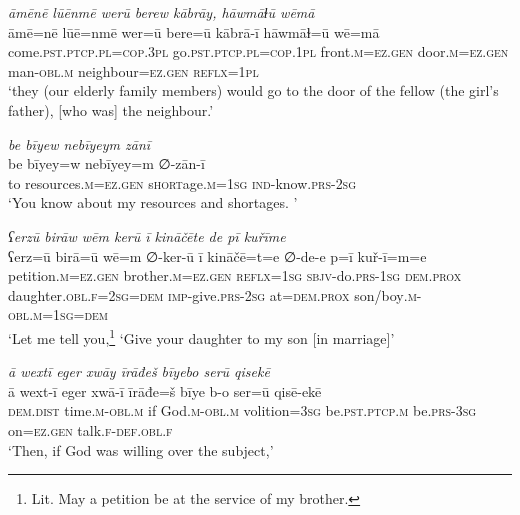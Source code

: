 \ea \label{RE.3}
\textit{āmēnē lūēnmē werū berew kābrāy, hāwmāɫū wēmā} \\ 
\gll āmē=nē lūē=nmē wer=ū bere=ū kābrā-ī hāwmāɫ=ū wē=mā \\ 
 come\textsc{.pst}\textsc{.ptcp}\textsc{.pl}\textsc{=cop}\textsc{.3pl} go\textsc{.pst}\textsc{.ptcp}\textsc{.pl}\textsc{=cop}\textsc{.\textsc{1pl}} front\textsc{.m}\textsc{\textsc{=ez.gen}} door\textsc{.m}\textsc{\textsc{=ez.gen}} man\textsc{-obl}\textsc{.m} neighbour\textsc{\textsc{=ez.gen}} \textsc{reflx}\textsc{=\textsc{1pl}} \\ 
\glt `they (our elderly family members) would go to the door of the fellow (the girl’s father), [who was] the neighbour.'
\z 
 
\ea \label{RE.6}
\textit{be bīyew nebīyeym zānī} \\ 
\gll be bīyey=w nebīyey=m ∅-zān-ī \\ 
 to resources\textsc{.m}\textsc{\textsc{=ez.gen}} s\textsc{hort}age\textsc{.m}\textsc{=\textsc{1sg}} \textsc{ind-}know\textsc{.prs}-\textsc{2sg} \\ 
\glt `You know about my resources and shortages. '
\z 
 
\ea \label{RE.7}
\textit{ʕerzū birāw wēm kerū ī kināčēte de pī kuřīme} \\ 
\gll ʕerz=ū birā=ū wē=m ∅-ker-ū ī kināčē=t=e ∅-de-e p=ī kuř-ī=m=e \\ 
 petition\textsc{.m}\textsc{\textsc{=ez.gen}} brother\textsc{.m}\textsc{\textsc{=ez.gen}} \textsc{reflx}\textsc{=\textsc{1sg}} \textsc{sbjv-}do\textsc{.prs}\textsc{-\textsc{1sg}} \textsc{dem.prox} daughter\textsc{.obl}\textsc{.f}\textsc{=\textsc{2sg}}\textsc{=dem} \textsc{imp-}give\textsc{.prs}-\textsc{2sg} at=\textsc{dem.prox} son/boy\textsc{.m}\textsc{-obl}\textsc{.m}\textsc{=\textsc{1sg}}\textsc{=dem} \\ 
\glt `Let me tell you,\footnote{Lit. May a petition be at the service of my brother.} ‘Give your daughter to my son [in marriage]'
\z 
 
\ea \label{RE.8}
\textit{ā wextī eger xwāy īrāđeš bīyebo serū qisekē} \\ 
\gll ā wext-ī eger xwā-ī īrāđe=š bīye b-o ser=ū qisē-ekē \\ 
 \textsc{dem.dist} time\textsc{.m}\textsc{-obl}\textsc{.m} if God\textsc{.m}\textsc{-obl}\textsc{.m} volition\textsc{=3sg} be\textsc{.pst}\textsc{.ptcp}\textsc{.m} be\textsc{.prs}\textsc{-3sg} on\textsc{\textsc{=ez.gen}} talk\textsc{.f}\textsc{-def}\textsc{.obl}\textsc{.f} \\ 
\glt `Then, if God was willing over the subject,'
\z 
 
